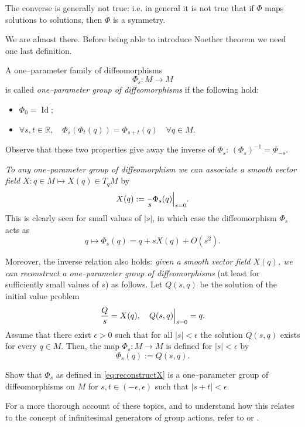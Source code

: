 \documentclass[english,fontsize=11pt,paper=a5,oneside]{scrbook}
\newcommand{\R}{\mathbb{R}}
\let\d\relax
\DeclareMathOperator{\d}{d}
\DeclareMathOperator{\Id}{Id}
\theoremstyle{definition}
\newenvironment{remark}
  {\pushQED{\qed}\renewcommand{\qedsymbol}{$\lozenge$}\remarkx}
  {\popQED\endremarkx}
\newenvironment{exercise}
  {\pushQED{\qed}\renewcommand{\qedsymbol}{$\maltese$}\exercisex}
  {\popQED\endexercisex}
\begin{document}
The converse is generally not true: i.e. in general it is not true that if $\Phi$ maps solutions to solutions, then $\Phi$ is a symmetry.

We are almost there.
Before being able to introduce Noether theorem we need one last definition.

A one--parameter family of diffeomorphisms
\begin{equation}
    \Phi_s : M \to M
\end{equation}
is called \emph{one--parameter group of diffeomorphisms} if the following hold:
\begin{itemize}
    \item $\Phi_0 = \Id$;
    \item $\forall s, t \in \R, \quad \Phi_s(\Phi_t(q)) = \Phi_{s+t}(q)\quad \forall q\in M$.
\end{itemize}
Observe that these two properties give away the inverse of $\Phi_s$: $(\Phi_s)^{-1} = \Phi_{-s}$.

\begin{remark}
\emph{To any one--parameter group of diffeomorphism we can associate a smooth vector field $X : q\in M \mapsto X(q)\in T_qM$} by
\begin{equation}
    X(q) := \frac{\d}{\d s} \Phi_s(q) \Big|_{s=0}.
\end{equation}
This is clearly seen for small values of $|s|$, in which case the diffeomorphism $\Phi_s$ acts as
\begin{equation}\label{eq:infinitesimalSymmetryExp}
    q \mapsto \Phi_s(q) = q + s X(q) + O(s^2).
\end{equation}

Moreover, the inverse relation also holds: \emph{given a smooth vector field $X(q)$, we can reconstruct a one--parameter group of diffeomorphisms} (at least for sufficiently small values of $s$) as follows.
Let $Q(s, q)$ be the solution of the initial value problem
\begin{equation}\label{eq:NoetherCoords}
    \frac{\d Q}{\d s} = X(q), \quad Q(s, q)\Big|_{s=0} = q.
\end{equation}
Assume that there exist $\epsilon >0$ such that for all $|s|<\epsilon$ the solution $Q(s,q)$ exists for every $q\in M$.
Then, the map $\Phi_s:M\to M$ is defined for $|s|<\epsilon$ by 
\begin{equation}\label{eq:reconstructX}
    \Phi_s(q) := Q(s, q).
\end{equation}

\begin{exercise}
    Show that $\Phi_s$ as defined in \eqref{eq:reconstructX} is a one--parameter group of diffeomorphisms on $M$ for $s,t \in(-\epsilon,\epsilon)$ such that $|s + t| < \epsilon$.
\end{exercise}

For a more thorough account of these topics, and to understand how this relates to the concept of infinitesimal generators of group actions, refer to \cite[Chapters 9 and 20]{book:lee} or \cite[Chapters 3 and 4]{lectures:aom:seri}.
\end{remark}
\end{document}
